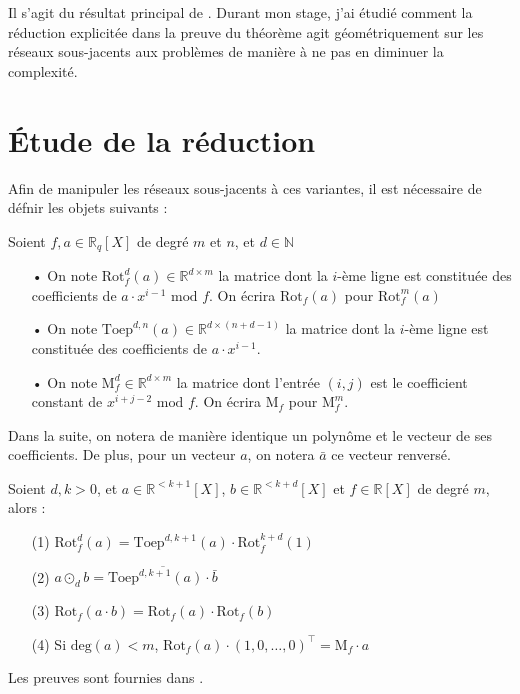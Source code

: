 \documentclass[11pt,a4paper]{article}
\begin{document}
Il s'agit du résultat principal de \cite{mplwe}. Durant mon stage, j'ai étudié comment la réduction explicitée dans la preuve du théorème agit géométriquement sur les réseaux sous-jacents aux problèmes de manière à ne pas en diminuer 	la complexité.

\section{Étude de la réduction}

Afin de manipuler les réseaux sous-jacents à ces variantes, il est nécessaire de défnir les objets suivants : 

\begin{defin} Soient $f,a\in \mathbb{R}_q[X]$ de degré $m$ et $n$, et $d \in \mathbb{N}$
\begin{enumerate}
\item[•] On note $\text{Rot}^d_f(a) \in \mathbb{R}^{d\times m}$ la matrice dont la $i$-ème ligne est constituée des coefficients de $a\cdot x^{i-1}\text{ mod } f$. On écrira $\text{Rot}_f(a)$ pour  $\text{Rot}^m_f(a)$
\item[•] On note $\text{Toep}^{d,n}(a) \in \mathbb{R}^{d\times(n+d-1)}$ la matrice dont la $i$-ème ligne est constituée des coefficients de $a\cdot x^{i-1}$.
\item[•] On note $\text{M}_f^d \in \mathbb{R}^{d\times m}$ la matrice dont l'entrée $(i,j)$ est le coefficient constant de $x^{i+j-2}\text{ mod }f$. On écrira $\text{M}_f$ pour  $\text{M}_f^m$.
\end{enumerate}
\end{defin}


Dans la suite, on notera de manière identique un polynôme et le vecteur de ses coefficients. De plus, pour un vecteur $a$, on notera $\bar a$ ce vecteur renversé. \\
\begin{lemma} Soient $d,k >0$, et $a \in \mathbb{R}^{<k+1}[X]$, $b \in \mathbb{R}^{<k+d}[X]$ et $f \in \mathbb{R}[X]$ de degré $m$, alors :
\begin{enumerate}
\item[(1)]$\text{Rot}^d_f(a) = \text{Toep}^{d,k+1}(a)\cdot\text{Rot}^{k+d}_f(1)$
\item[(2)] $a\odot_d b = \overline{\text{Toep}^{d,k+1}(a)\cdot \bar{b}}$
\item[(3)] $\text{Rot}_f(a\cdot b)=\text{Rot}_f(a)\cdot\text{Rot}_f(b)$
\item[(4)] Si $\text{deg}(a) < m$, $\text{Rot}_f(a)\cdot(1,0,\dots,0)^\top = \text{M}_f\cdot a$
\end{enumerate}
\end{lemma}
Les preuves sont fournies dans \cite{mplwe}.
\end{document}
